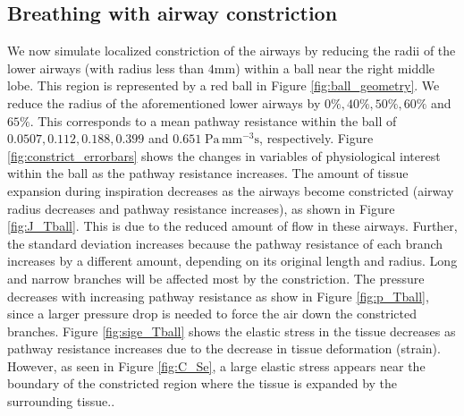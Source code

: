 \subsection{Breathing with airway constriction}
\label{sec:constriction}
We now simulate localized constriction of the airways by reducing the radii of the lower airways (with radius less than $4\mbox{mm}$) within a ball near the right middle lobe. This region is represented by a red ball in Figure \ref{fig:ball_geometry}. We reduce the radius of the aforementioned lower airways by $0\%,40\%,50\%,60\%$ and $65\%$. This corresponds to a mean pathway resistance within the ball of $0.0507,0.112,0.188,0.399$ and $0.651\;\mbox{Pa}\,\mbox{mm}^{-3} \mbox{s}$, respectively. Figure \ref{fig:constrict_errorbars} shows the changes in variables of physiological interest within the ball as the pathway resistance increases. The amount of tissue expansion during inspiration decreases as the airways become constricted (airway radius decreases and pathway resistance increases), as shown in Figure \ref{fig:J_Tball}. This is due to the reduced amount of flow in these airways. Further, the standard deviation increases because the pathway resistance of each branch increases by a different amount, depending on its original length and radius. Long and narrow branches will be affected most by the constriction. The pressure decreases with increasing pathway resistance as show in Figure \ref{fig:p_Tball}, since a larger pressure drop is needed to force the air down the constricted branches. Figure \ref{fig:sige_Tball} shows the elastic stress in the tissue decreases as pathway resistance increases due to the decrease in tissue deformation (strain). However, as seen in Figure \ref{fig:C_Se}, a large elastic stress appears near the boundary of the constricted region where the tissue is expanded by the surrounding tissue..
%


